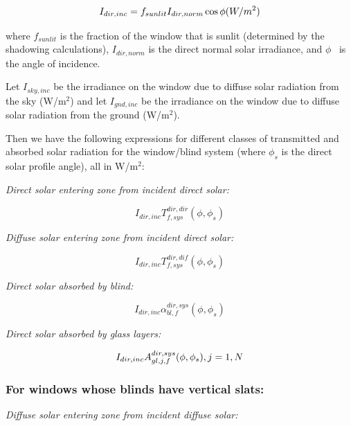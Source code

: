 \begin{equation}
{I_{dir,inc}} = {f_{sunlit}}{I_{dir,norm}}\cos \phi {\rm{    }}(W/{m^2})
\end{equation}

where \({f_{sunlit}}\) is the fraction of the window that is sunlit (determined by the shadowing calculations), \({I_{dir,norm}}\) is the direct normal solar irradiance, and \(\phi\) ~is the angle of incidence.

Let \({I_{sky,inc}}\) be the irradiance on the window due to diffuse solar radiation from the sky (W/m\(^{2}\)) and let \({I_{gnd,inc}}\) be the irradiance on the window due to diffuse solar radiation from the ground (W/m\(^{2}\)).

Then we have the following expressions for different classes of transmitted and absorbed solar radiation for the window/blind system (where \({\phi_s}\) is the direct solar profile angle), all in W/m\(^{2}\):

\emph{Direct solar entering zone from incident direct solar:}

\begin{equation}
{I_{dir,inc}}T_{f,sys}^{dir,dir}(\phi ,{\phi_s})
\end{equation}

\emph{Diffuse solar entering zone from incident direct solar:}

\begin{equation}
{I_{dir,inc}}T_{f,sys}^{dir,dif}(\phi ,{\phi_s})
\end{equation}

\emph{Direct solar absorbed by blind:}

\begin{equation}
{I_{dir,inc}}\alpha_{bl,f}^{dir,sys}(\phi ,{\phi_s})
\end{equation}

\emph{Direct solar absorbed by glass layers:}

\begin{equation}
{I_{dir,inc}}A_{gl,j,f}^{dir,sys}(\phi ,{\phi_s}),{\rm{    }}j = 1,N
\end{equation}

\subsubsection{For windows whose blinds have vertical slats:}\label{for-windows-whose-blinds-have-vertical-slats}

\emph{Diffuse solar entering zone from incident diffuse solar:}

